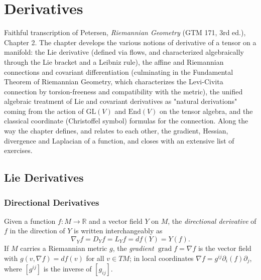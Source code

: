 \chapter{Derivatives}
\label{chap:pet-derivatives}

Faithful transcription of Petersen, \emph{Riemannian Geometry} (GTM 171, 3rd ed.),
Chapter 2. The chapter develops the various notions of derivative of a tensor on
a manifold: the Lie derivative (defined via flows, and characterized
algebraically through the Lie bracket and a Leibniz rule), the affine and
Riemannian connections and covariant differentiation (culminating in the
Fundamental Theorem of Riemannian Geometry, which characterizes the Levi-Civita
connection by torsion-freeness and compatibility with the metric), the unified
algebraic treatment of Lie and covariant derivatives as "natural derivations"
coming from the action of $\mathrm{GL}(V)$ and $\mathrm{End}(V)$ on the tensor
algebra, and the classical coordinate (Christoffel symbol) formulas for the
connection. Along the way the chapter defines, and relates to each other, the
gradient, Hessian, divergence and Laplacian of a function, and closes with an
extensive list of exercises.

\section{Lie Derivatives}

\subsection{Directional Derivatives}

\begin{definition}
  \label{def:pet-ch2-directional-derivative}
  \leanok
  Given a function $f:M\to\mathbb{R}$ and a vector field $Y$ on $M$, the
  \emph{directional derivative} of $f$ in the direction of $Y$ is written
  interchangeably as
  \[
    \nabla_Yf=D_Yf=L_Yf=df(Y)=Y(f).
  \]
  If $M$ carries a Riemannian metric $g$, the \emph{gradient} $\operatorname{grad}f=\nabla f$
  is the vector field with $g(v,\nabla f)=df(v)$ for all $v\in TM$; in local
  coordinates $\nabla f=g^{ij}\partial_i(f)\partial_j$, where $[g^{ij}]$ is the inverse of
  $[g_{ij}]$.
\end{definition}

